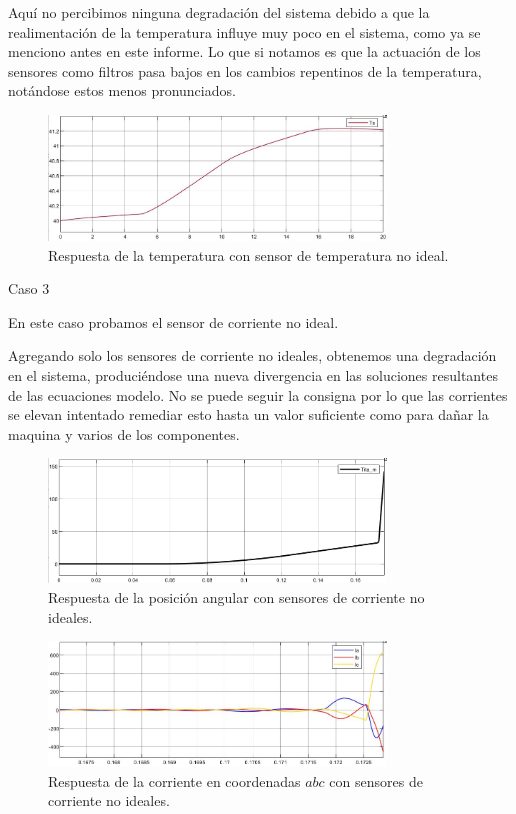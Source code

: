 \documentclass{article}
\begin{document}
Aquí no percibimos ninguna degradación del sistema debido a que la realimentación de la temperatura 
influye muy poco en el sistema, como ya se menciono antes en este informe. Lo que si notamos es que
la actuación de los sensores como filtros pasa bajos en los cambios repentinos de la temperatura, 
notándose estos menos pronunciados.
\begin{figure}[H]
    \centering
    \includegraphics[width=0.8\textwidth]{5.2.5.d.3.png}
    \caption{Respuesta de la temperatura con sensor de temperatura no ideal.}
\end{figure}

\bullet Caso 3

En este caso probamos el sensor de corriente no ideal.

Agregando solo los sensores de corriente no ideales, obtenemos una degradación en el sistema, 
produciéndose una nueva divergencia en las soluciones resultantes de las ecuaciones modelo. No 
se puede seguir la consigna por lo que las corrientes se elevan intentado remediar esto hasta 
un valor suficiente como para dañar la maquina y varios de los componentes.

\begin{figure}[H]
    \centering
    \includegraphics[width=0.8\textwidth]{5.2.5.d.4.png}
    \caption{Respuesta de la posición angular con sensores de corriente no ideales.}
\end{figure}

\begin{figure}[H]
    \centering
    \includegraphics[width=0.8\textwidth]{5.2.5.d.5.png}
    \caption{Respuesta de la corriente en coordenadas $abc$ con sensores de corriente no ideales.}
\end{figure}
\end{document}
